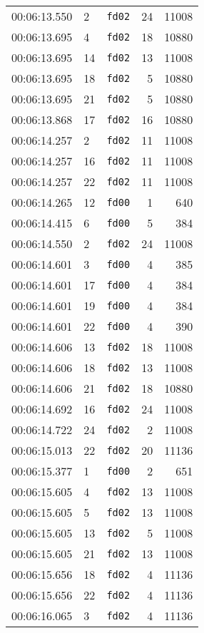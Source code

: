 \documentclass{article}
\begin{document}
\begin{longtable}{lllrr}
00:06:13.550 & 2 & \texttt{fd02} & 24 & 11008 \\
00:06:13.695 & 4 & \texttt{fd02} & 18 & 10880 \\
00:06:13.695 & 14 & \texttt{fd02} & 13 & 11008 \\
00:06:13.695 & 18 & \texttt{fd02} & 5 & 10880 \\
00:06:13.695 & 21 & \texttt{fd02} & 5 & 10880 \\
00:06:13.868 & 17 & \texttt{fd02} & 16 & 10880 \\
00:06:14.257 & 2 & \texttt{fd02} & 11 & 11008 \\
00:06:14.257 & 16 & \texttt{fd02} & 11 & 11008 \\
00:06:14.257 & 22 & \texttt{fd02} & 11 & 11008 \\
00:06:14.265 & 12 & \texttt{fd00} & 1 & 640 \\
00:06:14.415 & 6 & \texttt{fd00} & 5 & 384 \\
00:06:14.550 & 2 & \texttt{fd02} & 24 & 11008 \\
00:06:14.601 & 3 & \texttt{fd00} & 4 & 385 \\
00:06:14.601 & 17 & \texttt{fd00} & 4 & 384 \\
00:06:14.601 & 19 & \texttt{fd00} & 4 & 384 \\
00:06:14.601 & 22 & \texttt{fd00} & 4 & 390 \\
00:06:14.606 & 13 & \texttt{fd02} & 18 & 11008 \\
00:06:14.606 & 18 & \texttt{fd02} & 13 & 11008 \\
00:06:14.606 & 21 & \texttt{fd02} & 18 & 10880 \\
00:06:14.692 & 16 & \texttt{fd02} & 24 & 11008 \\
00:06:14.722 & 24 & \texttt{fd02} & 2 & 11008 \\
00:06:15.013 & 22 & \texttt{fd02} & 20 & 11136 \\
00:06:15.377 & 1 & \texttt{fd00} & 2 & 651 \\
00:06:15.605 & 4 & \texttt{fd02} & 13 & 11008 \\
00:06:15.605 & 5 & \texttt{fd02} & 13 & 11008 \\
00:06:15.605 & 13 & \texttt{fd02} & 5 & 11008 \\
00:06:15.605 & 21 & \texttt{fd02} & 13 & 11008 \\
00:06:15.656 & 18 & \texttt{fd02} & 4 & 11136 \\
00:06:15.656 & 22 & \texttt{fd02} & 4 & 11136 \\
00:06:16.065 & 3 & \texttt{fd02} & 4 & 11136 \\

\end{longtable}
\end{document}
